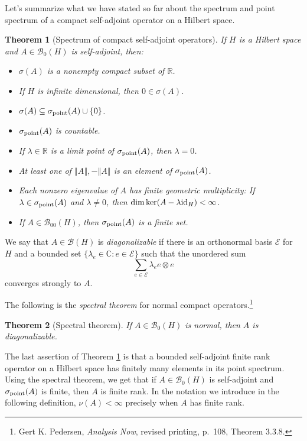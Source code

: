 \documentclass{article}
\newcommand{\id}{\ensuremath\mathrm{id}}
\newcommand{\point}{\ensuremath\sigma_{\mathrm{point}}}
\newcommand{\norm}[1]{\left\Vert #1 \right\Vert}
\newtheorem{theorem}{Theorem}
\theoremstyle{definition}
\begin{document}
Let's summarize what we have stated so far about the spectrum and point spectrum of a compact self-adjoint operator on a Hilbert space.

\begin{theorem}[Spectrum of compact self-adjoint operators]
If $H$ is a Hilbert space and $A \in \mathscr{B}_0(H)$ is self-adjoint, then:
\begin{itemize}
\item $\sigma(A)$ is a nonempty compact subset of $\mathbb{R}$.
\item If $H$ is infinite dimensional,  then $0 \in \sigma(A)$.
\item $\sigma(A) \subseteq \point(A) \cup \{0\}$.
\item $\point(A)$ is countable.
\item If $\lambda \in \mathbb{R}$ is a limit point of $\point(A)$, then $\lambda=0$.
\item At least one of $\norm{A},-\norm{A}$ is an element of $\point(A)$.
\item Each nonzero eigenvalue of $A$ has finite geometric multiplicity: If $\lambda \in \point(A)$ and $\lambda \neq 0$, then $\dim \ker(A-\lambda \id_H)<\infty$.
\item If $A \in \mathscr{B}_{00}(H)$, then $\point(A)$ is a finite set.
\end{itemize}
\label{sactheorem}
\end{theorem}

We say that $A \in \mathscr{B}(H)$ is {\em diagonalizable} if there is an orthonormal basis $\mathscr{E}$ for $H$ and a bounded set $\{\lambda_e \in \mathbb{C}: e \in \mathscr{E}\}$
such that the unordered sum
\[
\sum_{e \in \mathscr{E}} \lambda_e e \otimes e
\]
converges  strongly to $A$.

The following is the {\em spectral theorem} for normal compact operators.\footnote{Gert K. Pedersen, {\em Analysis Now}, revised printing,
p.~108, Theorem 3.3.8.} 

\begin{theorem}[Spectral theorem]
If $A \in \mathscr{B}_0(H)$ is normal, then $A$ is diagonalizable.
\end{theorem}

The last assertion of Theorem \ref{sactheorem} is that a bounded  self-adjoint finite rank operator on a Hilbert space has finitely many elements in
its point spectrum. Using the spectral theorem, we get that if $A \in \mathscr{B}_0(H)$ is self-adjoint and $\point(A)$ is finite, then $A$ is finite rank.
In the notation we introduce in the following definition, $\nu(A)<\infty$ precisely when $A$ has finite rank.
\end{document}
